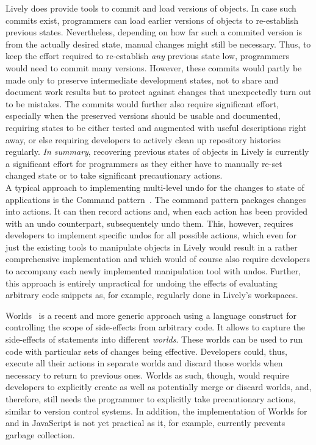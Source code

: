 Lively does provide tools to commit and load versions of objects.
In case such commits exist, programmers can load earlier versions of objects to re-establish previous states.
Nevertheless, depending on how far such a commited version is from the actually desired state, manual changes might still be necessary.
Thus, to keep the effort required to re-establish \emph{any} previous state low, programmers would need to commit many versions.
However, these commits would partly be made only to preserve intermediate development states, not to share and document work results but to protect against changes that unexpectedly turn out to be mistakes.
The commits would further also require significant effort, especially when the preserved versions should be usable and documented, requiring states to be either tested and augmented with useful descriptions right away, or else requiring developers to actively clean up repository histories regularly.
\emph{In summary}, recovering previous states of objects in Lively is currently a significant effort for programmers as they either have to manually re-set changed state or to take significant precautionary actions.\\

A typical approach to implementing multi-level undo for the changes to state of applications is the Command pattern~\cite{GammaHelmJohnsonVlissides95}.
The command pattern packages changes into actions.
It can then record actions and, when each action has been provided with an undo counterpart, subsequentely undo them.
This, however, requires developers to implement specific undos for all possible actions, which even for just the existing tools to manipulate objects in Lively would result in a rather comprehensive implementation and which would of course also require developers to accompany each newly implemented manipulation tool with undos.  
Further, this approach is entirely unpractical for undoing the effects of evaluating arbitrary code snippets as, for example, regularly done in Lively's workspaces.

Worlds~\cite{Warth2011Wor} is a recent and more generic approach using a language construct for controlling the scope of side-effects from arbitrary code.
It allows to capture the side-effects of statements into different \emph{worlds}.
These worlds can be used to run code with particular sets of changes being effective.
Developers could, thus, execute all their actions in separate worlds and discard those worlds when necessary to return to previous ones.
Worlds as such, though, would require developers to explicitly create as well as potentially merge or discard worlds, and, therefore, still needs the programmer to explicitly take precautionary actions, similar to version control systems.
In addition, the implementation of Worlds for and in JavaScript is not yet practical as it, for example, currently prevents garbage collection.\\

